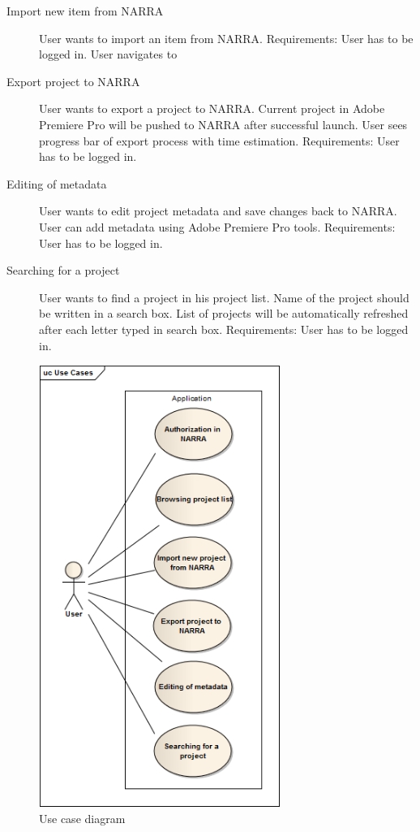 \documentclass[thesis=B,english]{FITthesis}[2012/10/20]
\begin{document}
\begin{description}
\begin{itemize}
	\end{itemize}
		\item[Import new item from NARRA]
User wants to import an item from NARRA. Requirements: User has to be logged in. User navigates to
		\item[Export project to NARRA]
User wants to export a project to NARRA. Current project in Adobe Premiere Pro will be pushed to NARRA after successful launch. User sees progress bar of export process with time estimation. Requirements: User has to be logged in.
		\item[Editing of metadata]
User wants to edit project metadata and save changes back to NARRA. User can add metadata using Adobe Premiere Pro tools. Requirements: User has to be logged in.
		\item[Searching for a project]
User wants to find a project in his project list. Name of the project should be written in a search box. List of projects will be automatically refreshed after each letter typed in search box. Requirements: User has to be logged in.
	\end{description}
	\begin{figure}
		\centering
		\includegraphics[width=0.7\textwidth]{UseCases.png}
		\caption{Use case diagram}\label{fig:usecase}
	\end{figure}
\end{document}
